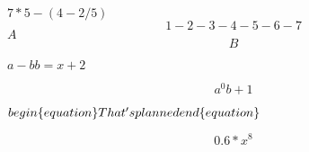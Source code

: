 \documentclass[11pt]{article}
\begin{document}
$7*5-(4-2/5)$
\begin{equation}
1-2-3-4-5-6-7
\end{equation}
$A$$$B$$

$
a-b
b=x+2
$

$$a^0
b+1
$$

$\\begin\{equation\}That's planned\\end\{equation\}$

\begin{equation}
0.6 * x^8
\end{equation}
\end{document}

